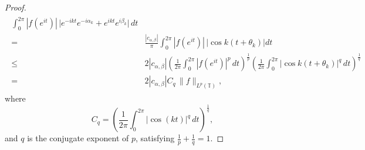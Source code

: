 \documentclass[10pt,a4paper]{amsart}
\newcommand{\abs}[1]{\left\vert#1\right\vert}
\begin{document}
\begin{proof}
\begin{align*}
\begin{split}
	\int_{0}^{2\pi}\abs{f\left(e^{it}\right)}\,\bigl|e^{-ikt}e^{-i\alpha_k}+e^{ikt}e^{i\beta_k}\bigr|\,dt
	\\=&\frac{|c_{\alpha,\beta}|}{\pi}\int_{0}^{2\pi}\abs{f\left(e^{it}\right)}\,\bigl|\cos k(t+\theta_k)\bigr|dt\\ \leq&
	2|c_{\alpha,\beta}|\left(\frac{1}{2\pi}\int_{0}^{2\pi}
	\abs{f\left(e^{it}\right)}^{p}\,dt\right)^{\frac{1}{p}}
	\left(\frac{1}{2\pi}\int_{0}^{2\pi}
	|\cos k(t+\theta_k)|^{q}\,dt\right)^{\frac{1}{q}}\\=&
	2|c_{\alpha,\beta}|C_q\,\|f\|_{L^p(\mathbb{T})} ,
    \end{split}
	\end{align*}
where
\[
C_q
=
\left(
\frac{1}{2\pi}
\int_{0}^{2\pi}
|\cos(kt)|^{q}\,dt
\right)^{\frac{1}{q}},
\]
and \(q\) is the conjugate exponent of \(p\), satisfying
\(\frac{1}{p}+\frac{1}{q}=1\).
\end{proof}
\end{document}
